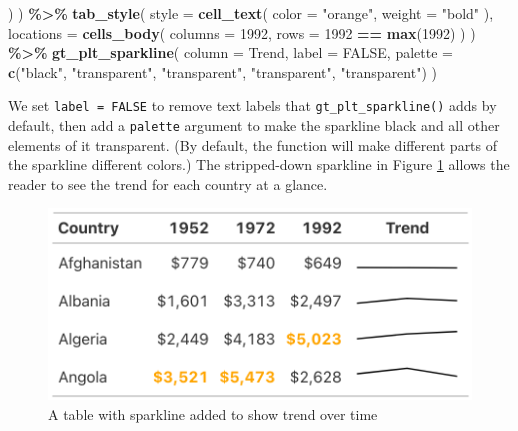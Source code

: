 \documentclass[
]{book}
\newenvironment{Shaded}{\begin{snugshade}}{\end{snugshade}}
\newcommand{\AttributeTok}[1]{\textcolor[rgb]{0.13,0.29,0.53}{#1}}
\newcommand{\ConstantTok}[1]{\textcolor[rgb]{0.56,0.35,0.01}{#1}}
\newcommand{\FunctionTok}[1]{\textcolor[rgb]{0.13,0.29,0.53}{\textbf{#1}}}
\newcommand{\NormalTok}[1]{#1}
\newcommand{\SpecialCharTok}[1]{\textcolor[rgb]{0.81,0.36,0.00}{\textbf{#1}}}
\newcommand{\StringTok}[1]{\textcolor[rgb]{0.31,0.60,0.02}{#1}}
\begin{document}
\begin{Shaded}
\begin{Highlighting}[]
\NormalTok{    )}
\NormalTok{  ) }\SpecialCharTok{\%\textgreater{}\%}
  \FunctionTok{tab\_style}\NormalTok{(}
    \AttributeTok{style =} \FunctionTok{cell\_text}\NormalTok{(}
      \AttributeTok{color =} \StringTok{"orange"}\NormalTok{,}
      \AttributeTok{weight =} \StringTok{"bold"}
\NormalTok{    ),}
    \AttributeTok{locations =} \FunctionTok{cells\_body}\NormalTok{(}
      \AttributeTok{columns =} \StringTok{\textasciigrave{}}\AttributeTok{1992}\StringTok{\textasciigrave{}}\NormalTok{,}
      \AttributeTok{rows =} \StringTok{\textasciigrave{}}\AttributeTok{1992}\StringTok{\textasciigrave{}} \SpecialCharTok{==} \FunctionTok{max}\NormalTok{(}\StringTok{\textasciigrave{}}\AttributeTok{1992}\StringTok{\textasciigrave{}}\NormalTok{)}
\NormalTok{    )}
\NormalTok{  ) }\SpecialCharTok{\%\textgreater{}\%}
  \FunctionTok{gt\_plt\_sparkline}\NormalTok{(}
    \AttributeTok{column =}\NormalTok{ Trend,}
    \AttributeTok{label =} \ConstantTok{FALSE}\NormalTok{,}
    \AttributeTok{palette =} \FunctionTok{c}\NormalTok{(}\StringTok{"black"}\NormalTok{, }\StringTok{"transparent"}\NormalTok{, }\StringTok{"transparent"}\NormalTok{, }\StringTok{"transparent"}\NormalTok{, }\StringTok{"transparent"}\NormalTok{)}
\NormalTok{  )}
\end{Highlighting}
\end{Shaded}

We set \texttt{label\ =\ FALSE} to remove text labels that \texttt{gt\_plt\_sparkline()} adds by default, then add a \texttt{palette} argument to make the sparkline black and all other elements of it transparent. (By default, the function will make different parts of the sparkline different colors.) The stripped-down sparkline in Figure \ref{fig:table-sparkline} allows the reader to see the trend for each country at a glance.

\begin{figure}
\includegraphics[width=1\linewidth]{nostarch/temp/F05011} \caption{A table with sparkline added to show trend over time}\label{fig:table-sparkline}
\end{figure}
\end{document}
